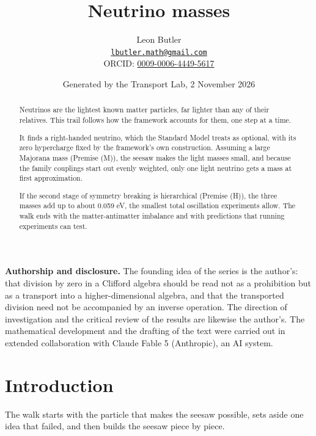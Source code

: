 \documentclass[11pt]{article}
\title{\bfseries Neutrino masses}
\author{Leon Butler\\ \normalsize\href{mailto:lbutler.math@gmail.com}{\texttt{lbutler.math@gmail.com}}\\ \normalsize ORCID: \href{https://orcid.org/0009-0006-4449-5617}{0009-0006-4449-5617}}
\date{Generated by the Transport Lab, 2 November 2026}
\theoremstyle{definition}
\theoremstyle{plain}
\begin{document}
\maketitle
\begin{abstract}
\normalsize
Neutrinos are the lightest known matter particles, far lighter than any of their relatives. This trail follows how the framework accounts for them, one step at a time.

It finds a right-handed neutrino, which the Standard Model treats as optional, with its zero hypercharge fixed by the framework's own construction. Assuming a large Majorana mass (Premise (M)), the seesaw makes the light masses small, and because the family couplings start out evenly weighted, only one light neutrino gets a mass at first approximation.

If the second stage of symmetry breaking is hierarchical (Premise (H)), the three masses add up to about 0.059 eV, the smallest total oscillation experiments allow. The walk ends with the matter-antimatter imbalance and with predictions that running experiments can test.
\end{abstract}
\newpage
\noindent \textbf{Authorship and disclosure. }The founding idea of the series is the author's: that division by zero in a Clifford algebra should be read not as a prohibition but as a transport into a higher-dimensional algebra, and that the transported division need not be accompanied by an inverse operation. The direction of investigation and the critical review of the results are likewise the author's. The mathematical development and the drafting of the text were carried out in extended collaboration with Claude Fable 5 (Anthropic), an AI system.

\noindent{}
\newpage

\section*{Introduction}
The walk starts with the particle that makes the seesaw possible, sets aside one idea that failed, and then builds the seesaw piece by piece.
\end{document}
